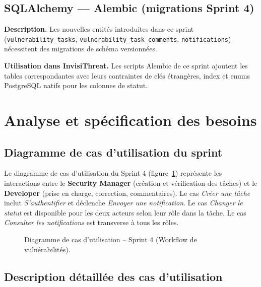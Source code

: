 \subsection{SQLAlchemy — Alembic (migrations Sprint 4)}

\textbf{Description.} Les nouvelles entités introduites dans ce sprint (\texttt{vulnerability\_tasks}, \texttt{vulnerability\_task\_comments}, \texttt{notifications}) nécessitent des migrations de schéma versionnées.

\textbf{Utilisation dans InvisiThreat.} Les scripts Alembic de ce sprint ajoutent les tables correspondantes avec leurs contraintes de clés étrangères, index et enums PostgreSQL natifs pour les colonnes de statut.

\section{Analyse et spécification des besoins}

\subsection{Diagramme de cas d'utilisation du sprint}

Le diagramme de cas d'utilisation du Sprint 4 (figure~\ref{fig:sprint4-use-case}) représente les interactions entre le \textbf{Security Manager} (création et vérification des tâches) et le \textbf{Developer} (prise en charge, correction, commentaires). Le cas \textit{Créer une tâche} inclut \textit{S'authentifier} et déclenche \textit{Envoyer une notification}. Le cas \textit{Changer le statut} est disponible pour les deux acteurs selon leur rôle dans la tâche. Le cas \textit{Consulter les notifications} est transverse à tous les rôles.

\begin{figure}[H]
\centering
\fbox{\rule{0pt}{2in}\rule{0.9\linewidth}{0pt}}
\caption{Diagramme de cas d'utilisation -- Sprint 4 (Workflow de vulnérabilités).}
\label{fig:sprint4-use-case}
\end{figure}

\subsection{Description détaillée des cas d'utilisation}

